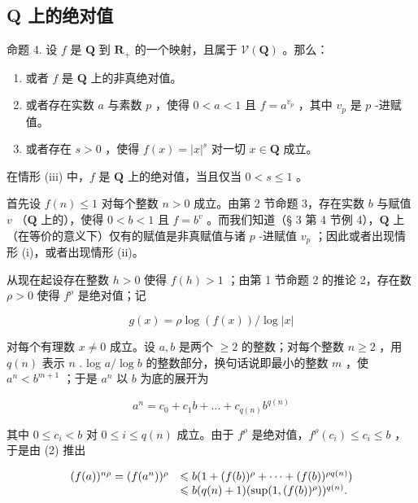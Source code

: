 \subsection{Q 上的绝对值}

命题 4. 设 \(f\) 是 \(\mathbf{Q}\) 到 \(\mathbf{R}_+\) 的一个映射，且属于 \(\mathcal{V}(\mathbf{Q})\) 。那么：

\begin{enumerate}
\def\labelenumi{(\roman{enumi})}
\item
  或者 \(f\) 是 \(\mathbf{Q}\) 上的非真绝对值。
\item
  或者存在实数 \(a\) 与素数 \(p\) ，使得 \(0 < a < 1\) 且 \(f = a^{v_p}\) ，其中 \(v_p\) 是 \(p\) -进赋值。
\item
  或者存在 \(s > 0\) ，使得 \(f(x) = |x|^s\) 对一切 \(x \in \mathbf{Q}\) 成立。
\end{enumerate}

在情形 (iii) 中，\(f\) 是 \(\mathbf{Q}\) 上的绝对值，当且仅当 \(0 < s \leqslant 1\) 。

首先设 \(f(n) \leqslant 1\) 对每个整数 \(n > 0\) 成立。由第 2 节命题 3，存在实数 \(b\) 与赋值 \(v\) （\(\mathbf{Q}\) 上的），使得 \(0 < b < 1\) 且 \(f = b^v\) 。而我们知道（§ 3 第 4 节例 4），\(\mathbf{Q}\) 上（在等价的意义下）仅有的赋值是非真赋值与诸 \(p\) -进赋值 \(v_p\) ；因此或者出现情形 (i)，或者出现情形 (ii)。

从现在起设存在整数 \(h > 0\) 使得 \(f(h) > 1\) ；由第 1 节命题 2 的推论 2，存在数 \(\rho > 0\) 使得 \(f^{\rho}\) 是绝对值；记

\[
g (x) = \rho \log (f (x)) / \log | x |
\]

对每个有理数 \(x \neq 0\) 成立。设 \(a, b\) 是两个 \(\geqslant 2\) 的整数；对每个整数 \(n \geqslant 2\) ，用 \(q(n)\) 表示 \(n\) . log \(a / \log b\) 的整数部分，换句话说即最小的整数 \(m\) ，使 \(a^n < b^{m+1}\) ；于是 \(a^n\) 以 \(b\) 为底的展开为

\[
a ^ {n} = c _ {0} + c _ {1} b + \dots + c _ {q (n)} b ^ {q (n)}\tag{2}
\]

其中 \(0 \leqslant c_{i} < b\) 对 \(0 \leqslant i \leqslant q(n)\) 成立。由于 \(f^{\rho}\) 是绝对值，\(f^{\rho}(c_{i}) \leqslant c_{i} \leqslant b\) ，于是由 (2) 推出

\[
\begin{array}{r l} (f (a)) ^ {n \rho} = (f (a ^ {n})) ^ {\rho} & \leqslant b (1 + (f (b)) ^ {\rho} + \dots + (f (b)) ^ {\rho q (n)}) \\ & \leqslant b (q (n) + 1) (\sup (1, (f (b)) ^ {\rho})) ^ {q (n)}. \end{array}
\]

